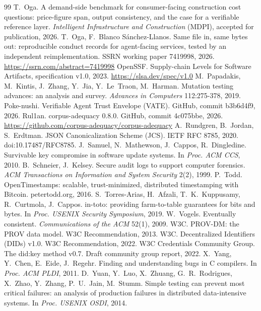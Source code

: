 \documentclass[preprint,12pt,authoryear]{elsarticle}
\begin{document}
\begin{thebibliography}{99}
 T.~Oga. A demand-side benchmark for consumer-facing construction cost questions: price-figure span, output consistency, and the case for a verifiable reference layer. \emph{Intelligent Infrastructure and Construction} (MDPI), accepted for publication, 2026.
 T.~Oga, F.~Blanco S\'anchez-Llanos. Same file in, same bytes out: reproducible conduct records for agent-facing services, tested by an independent reimplementation. SSRN working paper 7419998, 2026. \url{https://ssrn.com/abstract=7419998}
 OpenSSF. Supply-chain Levels for Software Artifacts, specification v1.0, 2023. \url{https://slsa.dev/spec/v1.0}
 M.~Papadakis, M.~Kintis, J.~Zhang, Y.~Jia, Y.~Le~Traon, M.~Harman. Mutation testing advances: an analysis and survey. \emph{Advances in Computers} 112:275-378, 2019.
 Poke-nushi. Verifiable Agent Trust Envelope (VATE). GitHub, commit b3b6d4f9, 2026.
 Rul1an. corpus-adequacy 0.8.0. GitHub, commit 4c075bbe, 2026. \url{https://github.com/corpus-adequacy/corpus-adequacy}
 A.~Rundgren, B.~Jordan, S.~Erdtman. JSON Canonicalization Scheme (JCS). IETF RFC 8785, 2020. doi:10.17487/RFC8785.
 J.~Samuel, N.~Mathewson, J.~Cappos, R.~Dingledine. Survivable key compromise in software update systems. In \emph{Proc. ACM CCS}, 2010.
 B.~Schneier, J.~Kelsey. Secure audit logs to support computer forensics. \emph{ACM Transactions on Information and System Security} 2(2), 1999.
 P.~Todd. OpenTimestamps: scalable, trust-minimized, distributed timestamping with Bitcoin. petertodd.org, 2016.
 S.~Torres-Arias, H.~Afzali, T.~K.~Kuppusamy, R.~Curtmola, J.~Cappos. in-toto: providing farm-to-table guarantees for bits and bytes. In \emph{Proc. USENIX Security Symposium}, 2019.
 W.~Vogels. Eventually consistent. \emph{Communications of the ACM} 52(1), 2009.
 W3C. PROV-DM: the PROV data model. W3C Recommendation, 2013.
 W3C. Decentralized Identifiers (DIDs) v1.0. W3C Recommendation, 2022.
 W3C Credentials Community Group. The did:key method v0.7. Draft community group report, 2022.
 X.~Yang, Y.~Chen, E.~Eide, J.~Regehr. Finding and understanding bugs in C compilers. In \emph{Proc. ACM PLDI}, 2011.
 D.~Yuan, Y.~Luo, X.~Zhuang, G.~R.~Rodrigues, X.~Zhao, Y.~Zhang, P.~U.~Jain, M.~Stumm. Simple testing can prevent most critical failures: an analysis of production failures in distributed data-intensive systems. In \emph{Proc. USENIX OSDI}, 2014.
\end{thebibliography}
\end{document}
